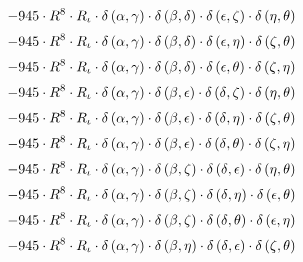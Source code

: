 \begin{subequations}
\begin{gather}
 \\[0.2em] \notag 		 - 945 \cdot R^{8} \cdot R_{\iota{}} \cdot \delta{}\left(\alpha{}, \gamma{}\right) \cdot \delta{}\left(\beta{}, \delta{}\right) \cdot \delta{}\left(\epsilon{}, \zeta{}\right) \cdot \delta{}\left(\eta{}, \theta{}\right) 
 \\[0.2em] \notag 		 - 945 \cdot R^{8} \cdot R_{\iota{}} \cdot \delta{}\left(\alpha{}, \gamma{}\right) \cdot \delta{}\left(\beta{}, \delta{}\right) \cdot \delta{}\left(\epsilon{}, \eta{}\right) \cdot \delta{}\left(\zeta{}, \theta{}\right) 
 \\[0.2em] \notag 		 - 945 \cdot R^{8} \cdot R_{\iota{}} \cdot \delta{}\left(\alpha{}, \gamma{}\right) \cdot \delta{}\left(\beta{}, \delta{}\right) \cdot \delta{}\left(\epsilon{}, \theta{}\right) \cdot \delta{}\left(\zeta{}, \eta{}\right) 
 \\[0.2em] \notag 		 - 945 \cdot R^{8} \cdot R_{\iota{}} \cdot \delta{}\left(\alpha{}, \gamma{}\right) \cdot \delta{}\left(\beta{}, \epsilon{}\right) \cdot \delta{}\left(\delta{}, \zeta{}\right) \cdot \delta{}\left(\eta{}, \theta{}\right) 
 \\[0.2em] \notag 		 - 945 \cdot R^{8} \cdot R_{\iota{}} \cdot \delta{}\left(\alpha{}, \gamma{}\right) \cdot \delta{}\left(\beta{}, \epsilon{}\right) \cdot \delta{}\left(\delta{}, \eta{}\right) \cdot \delta{}\left(\zeta{}, \theta{}\right) 
 \\[0.2em] \notag 		 - 945 \cdot R^{8} \cdot R_{\iota{}} \cdot \delta{}\left(\alpha{}, \gamma{}\right) \cdot \delta{}\left(\beta{}, \epsilon{}\right) \cdot \delta{}\left(\delta{}, \theta{}\right) \cdot \delta{}\left(\zeta{}, \eta{}\right) 
 \\[0.2em] \notag 		 - 945 \cdot R^{8} \cdot R_{\iota{}} \cdot \delta{}\left(\alpha{}, \gamma{}\right) \cdot \delta{}\left(\beta{}, \zeta{}\right) \cdot \delta{}\left(\delta{}, \epsilon{}\right) \cdot \delta{}\left(\eta{}, \theta{}\right) 
 \\[0.2em] \notag 		 - 945 \cdot R^{8} \cdot R_{\iota{}} \cdot \delta{}\left(\alpha{}, \gamma{}\right) \cdot \delta{}\left(\beta{}, \zeta{}\right) \cdot \delta{}\left(\delta{}, \eta{}\right) \cdot \delta{}\left(\epsilon{}, \theta{}\right) 
 \\[0.2em] \notag 		 - 945 \cdot R^{8} \cdot R_{\iota{}} \cdot \delta{}\left(\alpha{}, \gamma{}\right) \cdot \delta{}\left(\beta{}, \zeta{}\right) \cdot \delta{}\left(\delta{}, \theta{}\right) \cdot \delta{}\left(\epsilon{}, \eta{}\right) 
 \\[0.2em] \notag 		 - 945 \cdot R^{8} \cdot R_{\iota{}} \cdot \delta{}\left(\alpha{}, \gamma{}\right) \cdot \delta{}\left(\beta{}, \eta{}\right) \cdot \delta{}\left(\delta{}, \epsilon{}\right) \cdot \delta{}\left(\zeta{}, \theta{}\right) 

\end{gather}
\end{subequations}
